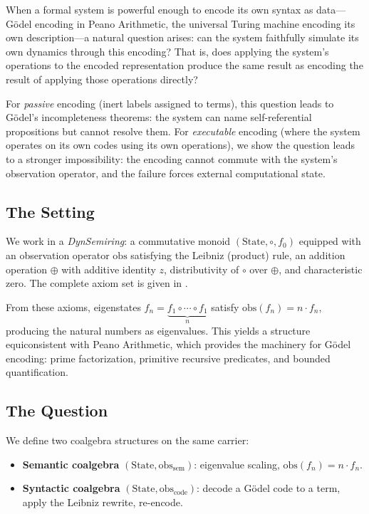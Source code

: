 \documentclass[11pt,a4paper]{article}
\theoremstyle{definition}
\theoremstyle{remark}
\newcommand{\compose}{\mathbin{\circ}}
\newcommand{\opl}{\oplus}
\newcommand{\obs}{\mathrm{obs}}
\newcommand{\fzero}{f_0}
\newcommand{\fone}{f_1}
\newcommand{\fn}{f_n}
\newcommand{\smul}[2]{#1 \cdot #2}
\begin{document}
When a formal system is powerful enough to encode its own syntax as
data---G\"odel encoding in Peano Arithmetic, the universal Turing machine
encoding its own description---a natural question arises: can the system
faithfully simulate its own dynamics through this encoding? That is, does
applying the system's operations to the encoded representation produce the
same result as encoding the result of applying those operations directly?

For \emph{passive} encoding (inert labels assigned to terms), this question
leads to G\"odel's incompleteness theorems: the system can name
self-referential propositions but cannot resolve them. For \emph{executable}
encoding (where the system operates on its own codes using its own
operations), we show the question leads to a stronger impossibility: the
encoding cannot commute with the system's observation operator, and the
failure forces external computational state.

\subsection{The Setting}

We work in a \emph{DynSemiring}: a commutative monoid
$(\mathrm{State}, \compose, \fzero)$ equipped with an observation operator
$\obs$ satisfying the Leibniz (product) rule, an addition operation $\opl$
with additive identity $z$, distributivity of $\compose$ over $\opl$, and
characteristic zero. The complete axiom set is given in
.

From these axioms, eigenstates
$\fn = \underbrace{\fone \compose \cdots \compose \fone}_{n}$ satisfy
$\obs(\fn) = \smul{n}{\fn}$, producing the natural numbers as eigenvalues.
This yields a structure equiconsistent with Peano Arithmetic, which provides
the machinery for G\"odel encoding: prime factorization, primitive recursive
predicates, and bounded quantification.

\subsection{The Question}

We define two coalgebra structures on the same carrier:
\begin{itemize}
  \item \textbf{Semantic coalgebra} $(\mathrm{State}, \obs_{\mathrm{sem}})$:
    eigenvalue scaling, $\obs(\fn) = \smul{n}{\fn}$.
  \item \textbf{Syntactic coalgebra} $(\mathrm{State}, \obs_{\mathrm{code}})$:
    decode a G\"odel code to a term, apply the Leibniz rewrite, re-encode.
\end{itemize}
\end{document}
